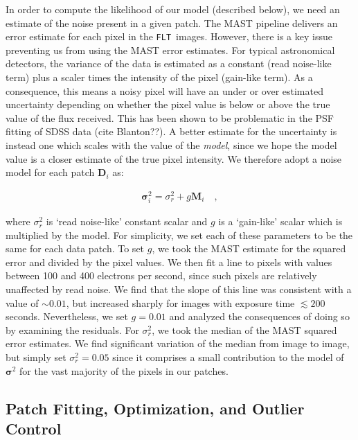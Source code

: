 \documentclass[12pt,letterpaper,preprint]{aastex}
\newcommand{\vect}[1]{\mathbf{#1}}
\newcommand{\FLT}{\texttt{FLT}}
\newcommand{\data}{\vect{D}}
\newcommand{\model}{\vect{M}}
\newcommand{\var}{\vect{\sigma}^2}
\begin{document}
In order to compute the likelihood of our model (described below), we need an estimate of the noise 
present in a given patch.  The MAST pipeline delivers an error estimate for each pixel in the \FLT\ images.   
However, there is a key issue preventing us from using the MAST error estimates.  
For typical astronomical detectors, the variance of 
the data is estimated as a constant (read noise-like term) plus a scaler times the intensity of the pixel 
(gain-like term).  As a consequence, this means a noisy pixel will have an under or over estimated uncertainty depending 
on whether the pixel value is below or above the true value of the flux received.  This has been shown to be 
problematic in the PSF fitting of SDSS data (cite Blanton??).  A better estimate for the uncertainty is 
instead one which scales with the value of the \emph{model}, since we hope the model value is a 
closer estimate of the true pixel intensity.  We therefore adopt a noise model for each patch $\data_i$
as:

\begin{eqnarray}
\var_i =  \sigma_{r}^2 + g \model_i
\quad , 
\label{eqn:model-noflat}
\end{eqnarray}

\noindent where $\sigma_{r}^2$ is `read noise-like' constant scalar and $g$ is a `gain-like' scalar 
which is multiplied by the model.  For simplicity, we set each of these parameters to be the same 
for each data patch.  To set $g$, we took the MAST estimate for the squared error and 
divided by the pixel values.  We then fit a line to pixels with values between 100 and 
400 electrons per second, since such pixels are relatively unaffected by read noise.  We find that 
the slope of this line was consistent with a value of 
$\sim0.01$, but increased sharply for images with exposure time $\lesssim 200$ seconds.  
Nevertheless, we set $g=0.01$ and analyzed the consequences of doing so by examining the 
residuals.  For $\sigma_{r}^2$, we took the median of the MAST squared error estimates.  We find 
significant variation of the median from image to image, but simply set $\sigma_{r}^2=0.05$ since 
it comprises a small contribution to the model of $\var$ for the vast majority of the pixels in our 
patches.

\subsection{Patch Fitting, Optimization, and Outlier Control}
\label{ssec:optimization}
\end{document}
